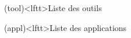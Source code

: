 \documentclass[../../main/main.tex]{subfiles}
\begin{document}
\begin{boxes}
\begin{tcb}
	\end{tcb}
	\begin{tcb}(tool)<lftt>{Liste des outils}
	\end{tcb}
	\begin{tcb}(appl)<lftt>{Liste des applications}
	\end{tcb}

\end{boxes}
\end{document}
